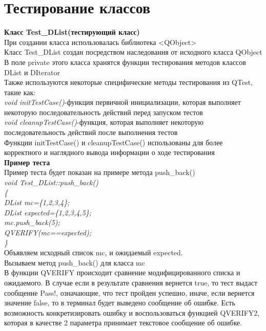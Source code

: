\documentclass[a4paper]{article}
\begin{document}
    {\section{Тестирование классов}
    {\LARGE \bf Класс Test\_DList(тестирующий класс)}\\
        \hfill\break
    При создании класса использовалась библиотека <QObject>\\
    Класс Test\_DList создан посредством наследования от исходного класса QObject\\
        \hfill\break
    В поле private этого класса хранятся функции тестирования методов классов DList и DIterator\\
    Также используются некоторые специфические методы тестирования из QTest, такие как:\\
        \hfill\break    
        \textit{void initTestCase()}-функция первичной инициализации, которая выполняет некоторую последовательность действий перед запуском тестов\\
        \hfill\break
        \textit{void cleanupTestCase()}-функция, которая выполняет некоторую последовательность действий после выполнения тестов\\
        \hfill\break
    Функции initTestCase() и cleanupTestCase() использованы для более корректного и наглядного вывода информации о ходе тестирования\\
        \hfill\break
    {\bf Пример теста}\\
        \hfill\break
    Пример теста будет показан на примере метода push\_back()\\
        \hfill\break
        \hfill\break
        \textit{
            void Test\_DList::push\_back()\\
            \{\\
        	  DList mc=\{1,2,3,4\};\\
        	  DList expected=\{1,2,3,4,5\};\\
        	  mc.push\_back(5);\\
        	  QVERIFY(mc==expected);\\
            \}\\
        }
        \hfill\break
   Объявляем исходный список mc, и ожидаемый expected.\\
   Вызываем метод push\_back() для класса mc\\
   В функции QVERIFY происходит сравнение модифицированного списка и ожидаемого. В случае если в результате сравнения вернется true, то тест выдаст сообщение Pass!, означающие, что тест пройден успешно, иначе, если вернется значение false, то в терминал будет выведено сообщение об ошибке. Есть возможность конкретизировать ошибку и воспользоваться функцией QVERIFY2, которая в качестве 2 параметра принимает текстовое сообщение об ошибке.\\      
           
    }  
\end{document}
